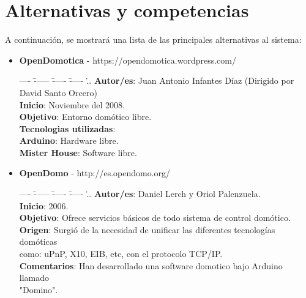 \section{Alternativas y competencias}
    A continuación, se mostrará una lista de las principales alternativas al sistema:\\
    \begin{itemize}
    \item {\bf OpenDomotica} -  https://opendomotica.wordpress.com/
            \begin{tabbing}
            ---- \= ------ \= ----- \= ----- \...\kill
            \>\> {\bf Autor/es}: Juan Antonio Infantes Díaz (Dirigido por David Santo Orcero)\\
            \>\> {\bf Inicio}: Noviembre del 2008.\\
            \>\> {\bf Objetivo}: Entorno domótico libre.\\
            \>\> {\bf Tecnologias utilizadas}:\\
            \>\>\> {\bf Arduino}: Hardware libre.\\
            \>\>\> {\bf Mister House}: Software libre.\\
            \end{tabbing}
               
     \item {\bf OpenDomo} - http://es.opendomo.org/
     		\begin{tabbing}
     		---- \= ------ \= ----- \= ----- \...\kill
            \>\> {\bf Autor/es}: Daniel Lerch y Oriol Palenzuela.\\
            \>\> {\bf Inicio}: 2006.\\
            \>\> {\bf Objetivo}: Ofrece servicios básicos de todo sistema de control domótico.\\
            \>\> {\bf Origen}: Surgió de la necesidad de unificar las diferentes tecnologías domóticas\\\>\>\> como: uPnP, X10, EIB, etc, con el protocolo TCP/IP.\\
            \>\> {\bf Comentarios}: Han desarrollado una software domotico bajo Arduino llamado\\\>\>\> "Domino".\\
            \end{tabbing}
    \end{itemize}
    
